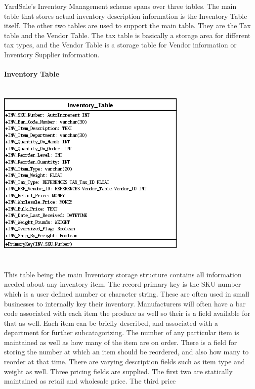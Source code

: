 \documentclass{report}
\begin{document}
    YardSale's Inventory Management scheme spans over three tables. The main table that
    stores actual inventory description information is the Inventory Table itself. The
    other two tables are used to support the main table. They are the Tax table and the
    Vendor Table. The tax table is basically a storage area for different tax types, and
    the Vendor Table is a storage table for Vendor information or Inventory Supplier
    information.\\
    \\
    {\bf Inventory Table}\\
    \\
    \\
    \includegraphics{Tables/InventoryTable.png}\\
    \\
    \\
    This table being the main Inventory storage structure contains all information needed
    about any inventory item. The record primary key is the SKU number which is a user
    defined number or character string. These are often used in small businesses to
    internally key their inventory. Manufacturers will often have a bar code associated
    with each item the produce as well so their is a field available for that as well.
    Each item can be briefly described, and associated with a department for further
    subcatagorizing. The number of any particular item is maintained as well as how many
    of the item are on order. There is a field for storing the number at which an item should
    be reordered, and also how many to reorder at that time. There are varying description
    fields such as item type and weight as well. Three pricing fields are supplied. The
    first two are statically maintained as retail and wholesale price. The third price
\end{document}
